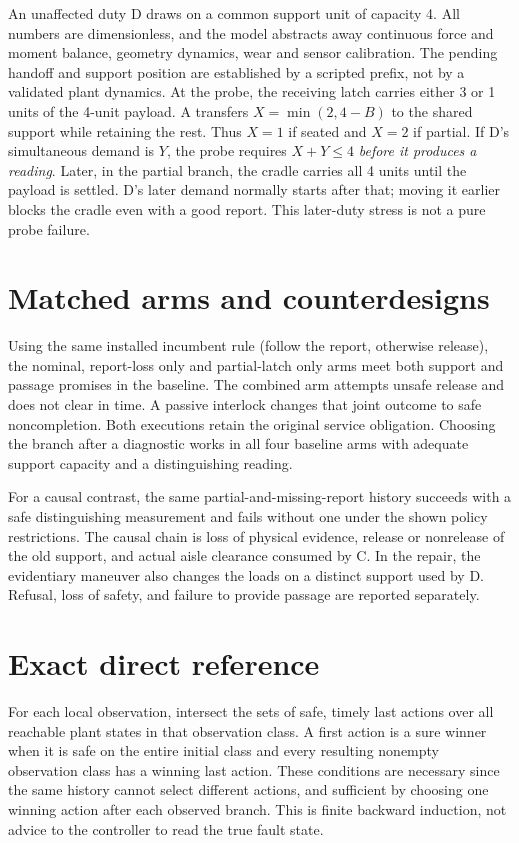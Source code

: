 \documentclass[11pt]{article}
\begin{document}
An unaffected duty D draws on a common support unit of capacity 4. All numbers are dimensionless, and the model abstracts away continuous force and moment balance, geometry dynamics, wear and sensor calibration. The pending handoff and support position are established by a scripted prefix, not by a validated plant dynamics. At the probe, the receiving latch carries either 3 or 1 units of the 4-unit payload. A transfers \(X=\min(2,4-B)\) to the shared support while retaining the rest. Thus \(X=1\) if seated and \(X=2\) if partial. If D's simultaneous demand is \(Y\), the probe requires \(X+Y\le4\) \emph{before it produces a reading}. Later, in the partial branch, the cradle carries all 4 units until the payload is settled. D's later demand normally starts after that; moving it earlier blocks the cradle even with a good report. This later-duty stress is not a pure probe failure.

\section{Matched arms and counterdesigns}
Using the same installed incumbent rule (follow the report, otherwise release), the nominal, report-loss only and partial-latch only arms meet both support and passage promises in the baseline. The combined arm attempts unsafe release and does not clear in time. A passive interlock changes that joint outcome to safe noncompletion. Both executions retain the original service obligation. Choosing the branch after a diagnostic works in all four baseline arms with adequate support capacity and a distinguishing reading.

For a causal contrast, the same partial-and-missing-report history succeeds with a safe distinguishing measurement and fails without one under the shown policy restrictions. The causal chain is loss of physical evidence, release or nonrelease of the old support, and actual aisle clearance consumed by C. In the repair, the evidentiary maneuver also changes the loads on a distinct support used by D. Refusal, loss of safety, and failure to provide passage are reported separately.

\section{Exact direct reference}
For each local observation, intersect the sets of safe, timely last actions over all reachable plant states in that observation class. A first action is a sure winner when it is safe on the entire initial class and every resulting nonempty observation class has a winning last action. These conditions are necessary since the same history cannot select different actions, and sufficient by choosing one winning action after each observed branch. This is finite backward induction, not advice to the controller to read the true fault state.
\end{document}
